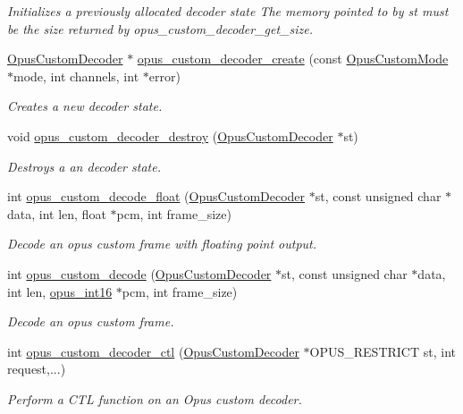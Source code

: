 \begin{DoxyCompactItemize}
\begin{DoxyCompactList}\small\item\em Initializes a previously allocated decoder state The memory pointed to by st must be the size returned by opus\+\_\+custom\+\_\+decoder\+\_\+get\+\_\+size. \end{DoxyCompactList}\item 
\hyperlink{group__opus__custom_gacae60f89c5ce7aeea69503451b9e2e6f}{Opus\+Custom\+Decoder} $\ast$ \hyperlink{group__opus__custom_ga16e5e655999536285638cac5e80673db}{opus\+\_\+custom\+\_\+decoder\+\_\+create} (const \hyperlink{group__opus__custom_gaf33847c711195b9edef896b73c96ec4f}{Opus\+Custom\+Mode} $\ast$mode, int channels, int $\ast$error)
\begin{DoxyCompactList}\small\item\em Creates a new decoder state. \end{DoxyCompactList}\item 
void \hyperlink{group__opus__custom_ga0e59e6389bd6478e9c3be48aff4459e1}{opus\+\_\+custom\+\_\+decoder\+\_\+destroy} (\hyperlink{group__opus__custom_gacae60f89c5ce7aeea69503451b9e2e6f}{Opus\+Custom\+Decoder} $\ast$st)
\begin{DoxyCompactList}\small\item\em Destroys a an decoder state. \end{DoxyCompactList}\item 
int \hyperlink{group__opus__custom_gac2c34002d4f546a535125e2780c81656}{opus\+\_\+custom\+\_\+decode\+\_\+float} (\hyperlink{group__opus__custom_gacae60f89c5ce7aeea69503451b9e2e6f}{Opus\+Custom\+Decoder} $\ast$st, const unsigned char $\ast$data, int len, float $\ast$pcm, int frame\+\_\+size)
\begin{DoxyCompactList}\small\item\em Decode an opus custom frame with floating point output. \end{DoxyCompactList}\item 
int \hyperlink{group__opus__custom_gafb6d3b90eed41b938009f4a32d633363}{opus\+\_\+custom\+\_\+decode} (\hyperlink{group__opus__custom_gacae60f89c5ce7aeea69503451b9e2e6f}{Opus\+Custom\+Decoder} $\ast$st, const unsigned char $\ast$data, int len, \hyperlink{opus__types_8h_acc9ed7cf60479eb81f9648c6ec27dc26}{opus\+\_\+int16} $\ast$pcm, int frame\+\_\+size)
\begin{DoxyCompactList}\small\item\em Decode an opus custom frame. \end{DoxyCompactList}\item 
int \hyperlink{group__opus__custom_ga88b9248e497f3c1b894f035011c569a9}{opus\+\_\+custom\+\_\+decoder\+\_\+ctl} (\hyperlink{group__opus__custom_gacae60f89c5ce7aeea69503451b9e2e6f}{Opus\+Custom\+Decoder} $\ast$O\+P\+U\+S\+\_\+\+R\+E\+S\+T\+R\+I\+CT st, int request,...)
\begin{DoxyCompactList}\small\item\em Perform a C\+TL function on an Opus custom decoder. \end{DoxyCompactList}\end{DoxyCompactItemize}


